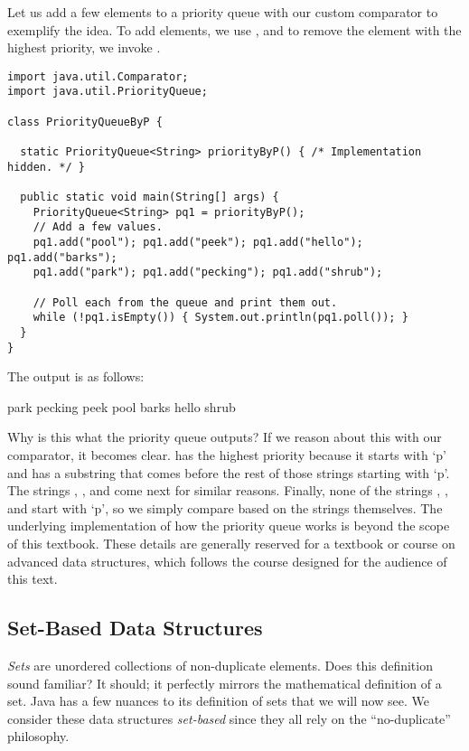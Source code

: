 Let us add a few elements to a priority queue with our custom comparator to exemplify the idea. To add elements, we use , and to remove the element with the highest priority, we invoke .

\begin{cl}[]{}
\begin{lstlisting}[language=MyJava]
import java.util.Comparator;
import java.util.PriorityQueue;

class PriorityQueueByP {

  static PriorityQueue<String> priorityByP() { /* Implementation hidden. */ }

  public static void main(String[] args) {
    PriorityQueue<String> pq1 = priorityByP();
    // Add a few values.
    pq1.add("pool"); pq1.add("peek"); pq1.add("hello"); pq1.add("barks");
    pq1.add("park"); pq1.add("pecking"); pq1.add("shrub");

    // Poll each from the queue and print them out.
    while (!pq1.isEmpty()) { System.out.println(pq1.poll()); }
  }
}
\end{lstlisting}
\end{cl}
The output is as follows:
\begin{verbnobox}[\small]
park
pecking
peek
pool
barks
hello
shrub
\end{verbnobox}
Why is this what the priority queue outputs? If we reason about this with our comparator, it becomes clear.  has the highest priority because it starts with `p' and has a substring that comes before the rest of those strings starting with `p'. The strings , , and  come next for similar reasons. Finally, none of the strings , , and  start with `p', so we simply compare based on the strings themselves. The underlying implementation of how the priority queue works is beyond the scope of this textbook. These details are generally reserved for a textbook or course on advanced data structures, which follows the course designed for the audience of this text.

\subsection{Set-Based Data Structures}
\emph{Sets} are unordered collections of non-duplicate elements. Does this definition sound familiar? It should; it perfectly mirrors the mathematical definition of a set. Java has a few nuances to its definition of sets that we will now see. We consider these data structures \emph{set-based} since they all rely on the ``no-duplicate'' philosophy.

